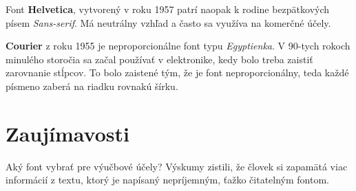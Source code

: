 \documentclass[a4paper, 11pt]{article}
\begin{document}
Font \textbf{Helvetica}, vytvorený v roku 1957 patrí naopak k rodine bezpätkových písem \emph{Sans-serif}. Má neutrálny vzhľad a často sa využíva na komerčné účely. \cite{magazine:font}

\textbf{Courier} z roku 1955 je neproporcionálne font typu \emph{Egyptienka}. V 90-tych rokoch minulého storočia sa začal používať v elektronike, kedy bolo treba zaistiť zarovnanie stĺpcov. \cite{garfield:my_type} To bolo zaistené tým, že je font neproporcionálny, teda každé písmeno zaberá na riadku rovnakú šírku.


\section{Zaujímavosti}
Aký font vybrať pre výučbové účely? Výskumy zistili, že človek si zapamätá viac informácií z textu, ktorý je napísaný nepríjemným, ťažko čitatelným fontom. \cite{ny:come_on}








\end{document}
